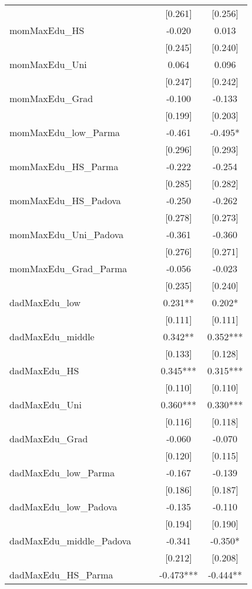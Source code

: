 \documentclass[]{article}
\begin{document}
\begin{tabular}{lcccc}
 &  &  & [0.261] & [0.256] \\
momMaxEdu\_HS &  &  & -0.020 & 0.013 \\
 &  &  & [0.245] & [0.240] \\
momMaxEdu\_Uni &  &  & 0.064 & 0.096 \\
 &  &  & [0.247] & [0.242] \\
momMaxEdu\_Grad &  &  & -0.100 & -0.133 \\
 &  &  & [0.199] & [0.203] \\
momMaxEdu\_low\_Parma &  &  & -0.461 & -0.495* \\
 &  &  & [0.296] & [0.293] \\
momMaxEdu\_HS\_Parma &  &  & -0.222 & -0.254 \\
 &  &  & [0.285] & [0.282] \\
momMaxEdu\_HS\_Padova &  &  & -0.250 & -0.262 \\
 &  &  & [0.278] & [0.273] \\
momMaxEdu\_Uni\_Padova &  &  & -0.361 & -0.360 \\
 &  &  & [0.276] & [0.271] \\
momMaxEdu\_Grad\_Parma &  &  & -0.056 & -0.023 \\
 &  &  & [0.235] & [0.240] \\
dadMaxEdu\_low &  &  & 0.231** & 0.202* \\
 &  &  & [0.111] & [0.111] \\
dadMaxEdu\_middle &  &  & 0.342** & 0.352*** \\
 &  &  & [0.133] & [0.128] \\
dadMaxEdu\_HS &  &  & 0.345*** & 0.315*** \\
 &  &  & [0.110] & [0.110] \\
dadMaxEdu\_Uni &  &  & 0.360*** & 0.330*** \\
 &  &  & [0.116] & [0.118] \\
dadMaxEdu\_Grad &  &  & -0.060 & -0.070 \\
 &  &  & [0.120] & [0.115] \\
dadMaxEdu\_low\_Parma &  &  & -0.167 & -0.139 \\
 &  &  & [0.186] & [0.187] \\
dadMaxEdu\_low\_Padova &  &  & -0.135 & -0.110 \\
 &  &  & [0.194] & [0.190] \\
dadMaxEdu\_middle\_Padova &  &  & -0.341 & -0.350* \\
 &  &  & [0.212] & [0.208] \\
dadMaxEdu\_HS\_Parma &  &  & -0.473*** & -0.444** \\

\end{tabular}
\end{document}
